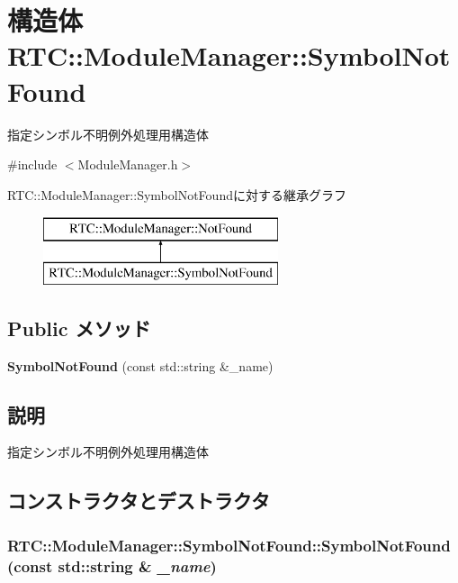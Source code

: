 \section{構造体 RTC::ModuleManager::SymbolNotFound}
\label{structRTC_1_1ModuleManager_1_1SymbolNotFound}


指定シンボル不明例外処理用構造体  




{\ttfamily \#include $<$ModuleManager.h$>$}

RTC::ModuleManager::SymbolNotFoundに対する継承グラフ\begin{figure}[H]
\begin{center}
\leavevmode
\includegraphics[height=2cm]{structRTC_1_1ModuleManager_1_1SymbolNotFound}
\end{center}
\end{figure}
\subsection*{Public メソッド}
\begin{DoxyCompactItemize}
\item 
{\bf SymbolNotFound} (const std::string \&\_\-name)
\end{DoxyCompactItemize}


\subsection{説明}
指定シンボル不明例外処理用構造体 

\subsection{コンストラクタとデストラクタ}
\subsubsection[{SymbolNotFound}]{\setlength{\rightskip}{0pt plus 5cm}RTC::ModuleManager::SymbolNotFound::SymbolNotFound (const std::string \& {\em \_\-name})\hspace{0.3cm}{\ttfamily  [inline]}}\label{structRTC_1_1ModuleManager_1_1SymbolNotFound_a15ff5cfb15c5eb9f4bb4501752e008ef}
